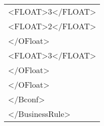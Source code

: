 \begin{center}
\begin{tabular}{|p{11cm}|}
 \textless FLOAT\textgreater 3\textless /FLOAT\textgreater\\
 \textless FLOAT\textgreater 2\textless /FLOAT\textgreater\\
 \textless /OFloat\textgreater\\
 \textless FLOAT\textgreater 3\textless /FLOAT\textgreater\\
 \textless /OFloat\textgreater\\
 \textless /OFloat\textgreater\\
 \textless /Bconf\textgreater\\
 \textless /BusinessRule\textgreater \\
 \hline
\end{tabular} \\
\end{center}

